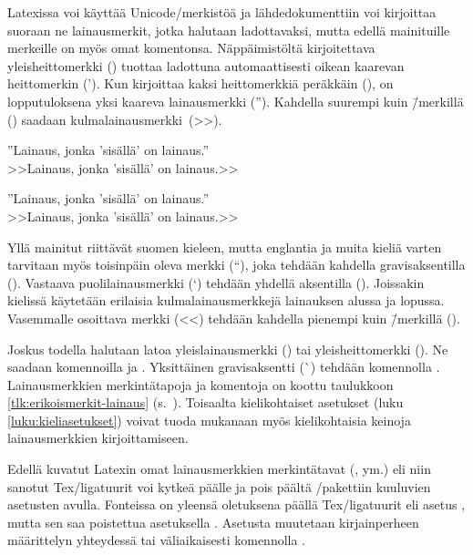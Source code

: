 Latexissa voi käyttää Unicode\-/merkistöä ja lähdedokumenttiin voi
kirjoittaa suoraan ne lainausmerkit, jotka halutaan ladottavaksi, mutta
edellä mainituille merkeille on myös omat komentonsa. Näppäimistöltä
kirjoitettava yleisheittomerkki () tuottaa ladottuna
automaattisesti oikean kaarevan heittomerkin ('). Kun kirjoittaa kaksi
heittomerkkiä peräkkäin (), on lopputuloksena yksi kaareva
lainausmerkki (''). Kahdella suurempi kuin \=/merkillä (\koodim{>>})
saadaan kulmalainausmerkki~(>>).

\begin{koodilohkosis}
''Lainaus, jonka 'sisällä' on lainaus.'' \\
>>Lainaus, jonka 'sisällä' on lainaus.>>
\end{koodilohkosis}

\begin{tulossis}
  ''Lainaus, jonka 'sisällä' on lainaus.'' \\
  >>Lainaus, jonka 'sisällä' on lainaus.>>
\end{tulossis}

Yllä mainitut riittävät suomen kieleen, mutta englantia ja muita kieliä
varten tarvitaan myös toisinpäin oleva merkki (``), joka tehdään
kahdella gravisaksentilla (). Vastaava puolilainausmerkki (`)
tehdään yhdellä aksentilla (). Joissakin kielissä käytetään
erilaisia kulmalainausmerkkejä lainauksen alussa ja lopussa. Vasemmalle
osoittava merkki (<<) tehdään kahdella pienempi kuin \=/merkillä
(\koodim{<<}).

Joskus todella halutaan latoa yleislainausmerkki (\textquotedbl) tai
yleisheittomerkki (\textquotesingle). Ne saadaan komennoilla
 ja . Yksittäinen
gravisaksentti (\`{}) tehdään komennolla .
Lainausmerkkien merkintätapoja ja komentoja on koottu taulukkoon
\ref{tlk:erikoismerkit-lainaus}
(s.~\pageref{tlk:erikoismerkit-lainaus}). Toisaalta kielikohtaiset
asetukset (luku \ref{luku:kieliasetukset}) voivat tuoda mukanaan myös
kielikohtaisia keinoja lainausmerkkien kirjoittamiseen.

Edellä kuvatut Latexin omat lainausmerkkien merkintätavat (,
\koodi{>>} ym.) eli niin sanotut Tex\-/ligatuurit voi kytkeä päälle ja
pois päältä \-/pakettiin kuuluvien asetusten avulla.
Fonteissa on yleensä oletuksena päällä Tex\-/ligatuurit eli asetus
, mutta sen saa poistettua asetuksella
. Asetusta muutetaan kirjainperheen
määrittelyn yhteydessä tai väliaikaisesti komennolla
.

